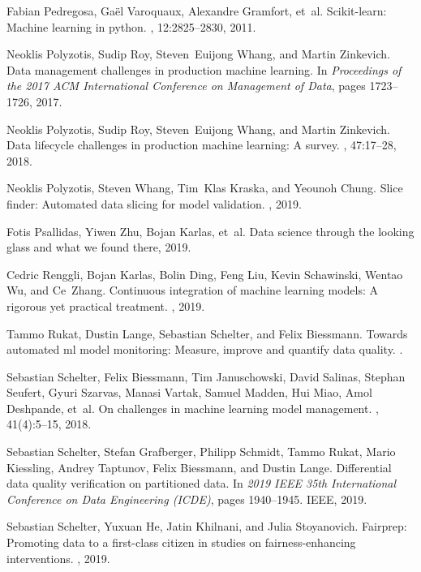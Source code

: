 \documentclass[11pt]{article}
\begin{document}
\begin{thebibliography}{10}
Fabian Pedregosa, Ga\"{e}l Varoquaux, Alexandre Gramfort, et~al.
\newblock Scikit-learn: Machine learning in python.
, 12:2825--2830, 2011.

Neoklis Polyzotis, Sudip Roy, Steven~Euijong Whang, and Martin Zinkevich.
\newblock Data management challenges in production machine learning.
\newblock In {\em Proceedings of the 2017 ACM International Conference on
  Management of Data}, pages 1723--1726, 2017.

Neoklis Polyzotis, Sudip Roy, Steven~Euijong Whang, and Martin Zinkevich.
\newblock Data lifecycle challenges in production machine learning: A survey.
, 47:17--28, 2018.

Neoklis Polyzotis, Steven Whang, Tim~Klas Kraska, and Yeounoh Chung.
\newblock Slice finder: Automated data slicing for model validation.
, 2019.

Fotis Psallidas, Yiwen Zhu, Bojan Karlas, et~al.
\newblock Data science through the looking glass and what we found there, 2019.

Cedric Renggli, Bojan Karlas, Bolin Ding, Feng Liu, Kevin Schawinski, Wentao
  Wu, and Ce~Zhang.
\newblock Continuous integration of machine learning models: A rigorous yet
  practical treatment.
, 2019.

Tammo Rukat, Dustin Lange, Sebastian Schelter, and Felix Biessmann.
\newblock Towards automated ml model monitoring: Measure, improve and quantify
  data quality.
.

Sebastian Schelter, Felix Biessmann, Tim Januschowski, David Salinas, Stephan
  Seufert, Gyuri Szarvas, Manasi Vartak, Samuel Madden, Hui Miao, Amol
  Deshpande, et~al.
\newblock On challenges in machine learning model management.
, 41(4):5--15, 2018.

Sebastian Schelter, Stefan Grafberger, Philipp Schmidt, Tammo Rukat, Mario
  Kiessling, Andrey Taptunov, Felix Biessmann, and Dustin Lange.
\newblock Differential data quality verification on partitioned data.
\newblock In {\em 2019 IEEE 35th International Conference on Data Engineering
  (ICDE)}, pages 1940--1945. IEEE, 2019.

Sebastian Schelter, Yuxuan He, Jatin Khilnani, and Julia Stoyanovich.
\newblock Fairprep: Promoting data to a first-class citizen in studies on
  fairness-enhancing interventions.
, 2019.


\end{thebibliography}
\end{document}
